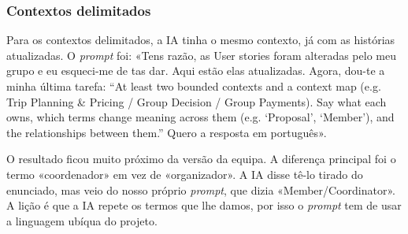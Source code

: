 \subsubsection{Contextos delimitados}

Para os contextos delimitados, a IA tinha o mesmo contexto, já com as histórias atualizadas. O \textit{prompt} foi: «Tens
razão, as User stories foram alteradas pelo meu grupo e eu esqueci-me de tas dar. Aqui estão elas atualizadas. Agora, dou-te
a minha última tarefa: “At least two bounded contexts and a context map (e.g. Trip Planning \& Pricing / Group Decision /
Group Payments). Say what each owns, which terms change meaning across them (e.g. ‘Proposal’, ‘Member’), and the
relationships between them.” Quero a resposta em português».

O resultado ficou muito próximo da versão da equipa. A diferença principal foi o termo «coordenador» em vez de
«organizador». A IA disse tê-lo tirado do enunciado, mas veio do nosso próprio \textit{prompt}, que dizia «Member/Coordinator».
A lição é que a IA repete os termos que lhe damos, por isso o \textit{prompt} tem de usar a linguagem ubíqua do projeto.
